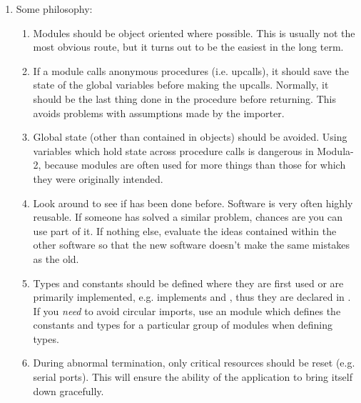 \begin{enumerate}
\item
    Some philosophy:
    \begin{enumerate}
    \item
        Modules should be object oriented where possible.  This
        is usually not the most obvious route, but it turns out to be the 
	easiest
        in the long term.  
    \item
        If a module calls anonymous procedures (i.e. upcalls),
        it should save the state of the global variables before making the
        upcalls.  Normally, it should be the last thing done
        in the procedure before returning.  This avoids problems with
        assumptions made by the importer.
    \item
        Global state (other than contained in objects) should be avoided.
        Using variables which hold state across procedure calls is 
        dangerous in Modula-2, because modules are often used for more
        things than those for which they were originally intended.  
    \item
        Look around to see if has been done before.  Software is very
        often highly reusable.  If someone has solved a similar problem,
        chances are you can use part of it.   If nothing else, evaluate
        the ideas contained within the other software so that the new
        software doesn't make the same mistakes as the old.
    \item
        Types and constants should be defined where they
        are first used or are primarily implemented, e.g.  
	implements  and , thus they are
	declared in .
	If you {\em need} to avoid circular imports, use an  
        module
        which defines the constants 
        and types for a particular group of modules when defining types.  
    \item 
        During abnormal termination, only critical resources should be
        reset (e.g. serial ports).  This will ensure the ability of the
        application to bring itself down gracefully.
    \end{enumerate}

\end{enumerate}

